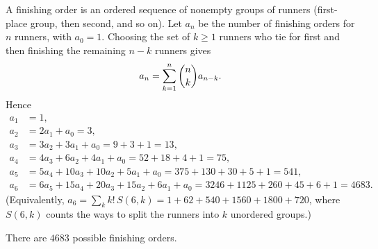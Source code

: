 A finishing order is an ordered sequence of nonempty groups of runners (first-place group, then second, and so on). Let $a_n$ be the number of finishing orders for $n$ runners, with $a_0=1$. Choosing the set of $k\ge1$ runners who tie for first and then finishing the remaining $n-k$ runners gives
\[a_n=\sum_{k=1}^{n}\dbinom nk a_{n-k}.\]
Hence
\begin{align*}
a_1&=1,\\
a_2&=2a_1+a_0=3,\\
a_3&=3a_2+3a_1+a_0=9+3+1=13,\\
a_4&=4a_3+6a_2+4a_1+a_0=52+18+4+1=75,\\
a_5&=5a_4+10a_3+10a_2+5a_1+a_0=375+130+30+5+1=541,\\
a_6&=6a_5+15a_4+20a_3+15a_2+6a_1+a_0=3246+1125+260+45+6+1=4683.
\end{align*}
(Equivalently, $a_6=\sum_k k!\,S(6,k)=1+62+540+1560+1800+720$, where $S(6,k)$ counts the ways to split the runners into $k$ unordered groups.)

There are $\boxed{4683}$ possible finishing orders.
